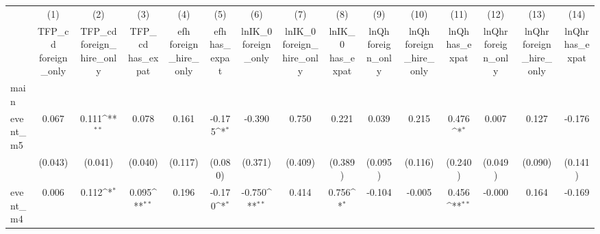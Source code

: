 {
\def\sym#1{\ifmmode^{#1}\else\(^{#1}\)\fi}
\begin{tabular}{l*{14}{c}}
\hline\hline
            &\multicolumn{1}{c}{(1)}&\multicolumn{1}{c}{(2)}&\multicolumn{1}{c}{(3)}&\multicolumn{1}{c}{(4)}&\multicolumn{1}{c}{(5)}&\multicolumn{1}{c}{(6)}&\multicolumn{1}{c}{(7)}&\multicolumn{1}{c}{(8)}&\multicolumn{1}{c}{(9)}&\multicolumn{1}{c}{(10)}&\multicolumn{1}{c}{(11)}&\multicolumn{1}{c}{(12)}&\multicolumn{1}{c}{(13)}&\multicolumn{1}{c}{(14)}\\
            &\multicolumn{1}{c}{TFP\_cd foreign\_only}&\multicolumn{1}{c}{TFP\_cd foreign\_hire\_only}&\multicolumn{1}{c}{TFP\_cd has\_expat}&\multicolumn{1}{c}{efh foreign\_hire\_only}&\multicolumn{1}{c}{efh has\_expat}&\multicolumn{1}{c}{lnIK\_0 foreign\_only}&\multicolumn{1}{c}{lnIK\_0 foreign\_hire\_only}&\multicolumn{1}{c}{lnIK\_0 has\_expat}&\multicolumn{1}{c}{lnQh foreign\_only}&\multicolumn{1}{c}{lnQh foreign\_hire\_only}&\multicolumn{1}{c}{lnQh has\_expat}&\multicolumn{1}{c}{lnQhr foreign\_only}&\multicolumn{1}{c}{lnQhr foreign\_hire\_only}&\multicolumn{1}{c}{lnQhr has\_expat}\\
\hline
main        &                     &                     &                     &                     &                     &                     &                     &                     &                     &                     &                     &                     &                     &                     \\
event\_m5    &       0.067         &       0.111\sym{**} &       0.078         &       0.161         &      -0.175\sym{*}  &      -0.390         &       0.750         &       0.221         &       0.039         &       0.215         &       0.476\sym{*}  &       0.007         &       0.127         &      -0.176         \\
            &     (0.043)         &     (0.041)         &     (0.040)         &     (0.117)         &     (0.080)         &     (0.371)         &     (0.409)         &     (0.389)         &     (0.095)         &     (0.116)         &     (0.240)         &     (0.049)         &     (0.090)         &     (0.141)         \\
[1em]
event\_m4    &       0.006         &       0.112\sym{*}  &       0.095\sym{**} &       0.196         &      -0.170\sym{*}  &      -0.750\sym{**} &       0.414         &       0.756\sym{*}  &      -0.104         &      -0.005         &       0.456\sym{**} &      -0.000         &       0.164         &      -0.169         \\

\end{tabular}}
